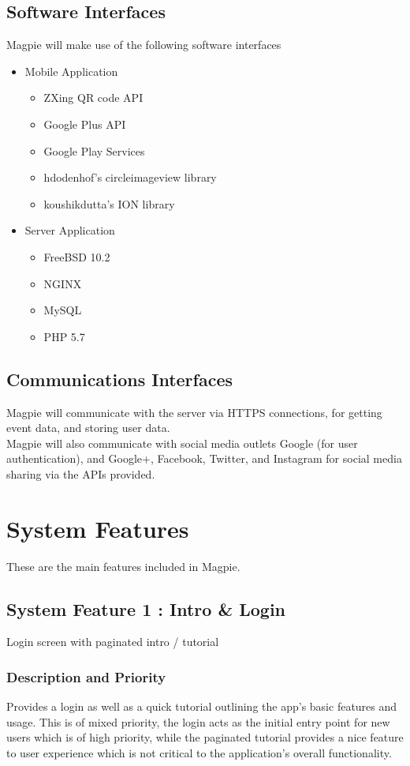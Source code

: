 \documentclass{scrreprt}
\begin{document}
\section{Software Interfaces}
Magpie will make use of the following software interfaces
\begin{itemize}
  \item Mobile Application
  \begin{itemize}
    \item ZXing QR code API
    \item Google Plus API
    \item Google Play Services
    \item hdodenhof's circleimageview library
    \item koushikdutta's ION library
  \end{itemize}
  \item Server Application
  \begin{itemize}
    \item FreeBSD 10.2
    \item NGINX
    \item MySQL
    \item PHP 5.7
  \end{itemize}
\end{itemize}

\section{Communications Interfaces}
Magpie will communicate with the server via HTTPS connections, for getting event
data, and storing user data. \\
Magpie will also communicate with social media outlets Google (for user authentication),
and Google+, Facebook, Twitter, and Instagram for social media sharing via the
APIs provided.

\chapter{System Features}
These are the main features included in Magpie.

\section{System Feature 1 : Intro \& Login}
Login screen with paginated intro / tutorial

\subsection{Description and Priority}
Provides a login as well as a quick tutorial outlining the app's  basic features and
usage. This is of mixed priority, the login acts as the initial entry point for new users
which is of high priority, while the paginated tutorial provides a nice feature to user
experience which is not critical to the application's overall functionality.
\end{document}
